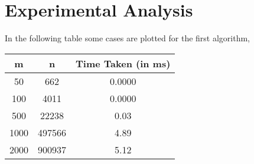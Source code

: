 \documentclass[10pt]{article}
\begin{document}
\section{Experimental Analysis}
In the following table some cases are plotted for the first algorithm,\newline
\begin{center}
 \begin{tabular}{||c | c | c||}
 \hline
 m & n & Time Taken (in ms) \\ [0.5ex]
 \hline\hline
 50 & 662 & 0.0000 \\
 \hline
 100 & 4011 & 0.0000 \\
 \hline
 500 & 22238 & 0.03 \\
 \hline
 1000 & 497566 & 4.89 \\
 \hline
 2000 & 900937 & 5.12 \\
 \hline
\end{tabular}
\end{center}
\end{document}
